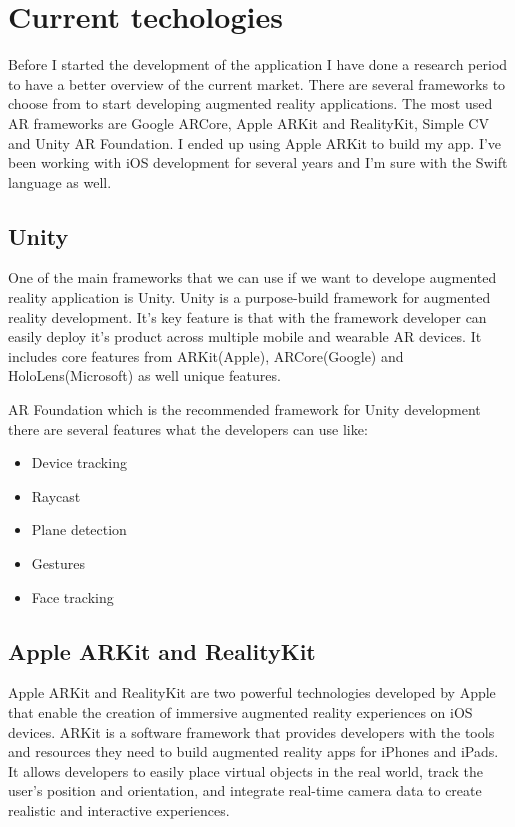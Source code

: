\chapter{Current techologies}

Before I started the development of the application I have done a research period to have a better overview of the current market. \cite{microsoftAr}
There are several frameworks to choose from to start developing augmented reality applications. The most used AR frameworks are Google ARCore, Apple ARKit and RealityKit, Simple CV and Unity AR Foundation. \cite{appleAr} \cite{appleArRealityKit}
I ended up using Apple ARKit to build my app. I've been working with iOS development for several years and I'm sure with the Swift language as well.

\section{Unity}

One of the main frameworks that we can use if we want to develope augmented reality application is Unity.
Unity is a purpose-build framework for augmented reality development. It's key feature is that with the framework developer can easily deploy it's product across multiple mobile and wearable AR devices. It includes core features from ARKit(Apple), ARCore(Google) and HoloLens(Microsoft) as well unique features.

AR Foundation which is the recommended framework for Unity development there are several features what the developers can use like:
\begin{itemize}
    \item Device tracking
    \item Raycast
    \item Plane detection
    \item Gestures
    \item Face tracking
\end{itemize} \cite{unity}

\section{Apple ARKit and RealityKit}

Apple ARKit and RealityKit are two powerful technologies developed by Apple that enable the creation of immersive augmented reality experiences on iOS devices. ARKit is a software framework that provides developers with the tools and resources they need to build augmented reality apps for iPhones and iPads. It allows developers to easily place virtual objects in the real world, track the user's position and orientation, and integrate real-time camera data to create realistic and interactive experiences.

